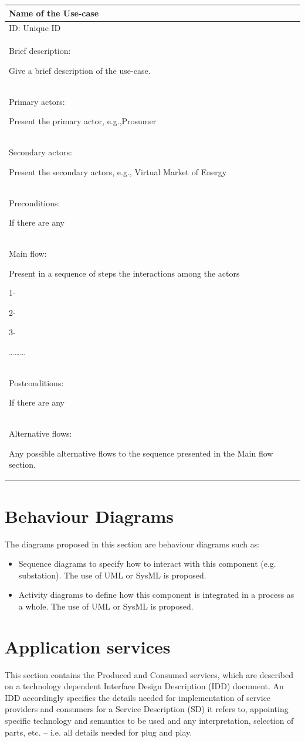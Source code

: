 \documentclass{article}
\begin{document}
\begin{flushleft}
\tablefirsthead{}
\tablehead{}
\tabletail{}
\tablelasttail{}
\begin{supertabular}{|m{6.01226in}|}
\hline
Name of the Use-case\\\hline
ID: Unique ID\\\hline
Brief description:

Give a brief description of the use-case.\\\hline
Primary actors:

Present the primary actor, e.g.,Prosumer\\\hline
Secondary actors:

Present the secondary actors, e.g., Virtual Market of Energy\\\hline
Preconditions:

If there are any\\\hline
Main flow:

Present in a sequence of steps the interactions among the actors 

1-

2-

3-

{\dots}{\dots}{\dots}\\\hline
Postconditions:

If there are any\\\hline
Alternative flows:

Any possible alternative flows to the sequence presented in the Main flow section.\\\hline
\end{supertabular}
\end{flushleft}
\section[Behaviour Diagrams]{Behaviour Diagrams}
The diagrams proposed in this section are behaviour diagrams such as:

\begin{itemize}
\item Sequence diagrams to specify how to interact with this component (e.g. substation). The use of UML or SysML is proposed.
\item Activity diagrams to define how this component is integrated in a process as a whole. The use of UML or SysML is proposed. 
\end{itemize}
\section{Application services}
This section contains the Produced and Consumed services, which are described on a technology dependent Interface Design Description (IDD) document. An IDD accordingly specifies the details needed for implementation of service providers and consumers for a Service Description (SD) it refers to, appointing specific technology and semantics to be used and any interpretation, selection of parts, etc. -- i.e. all details needed for plug and play.  
\end{document}
